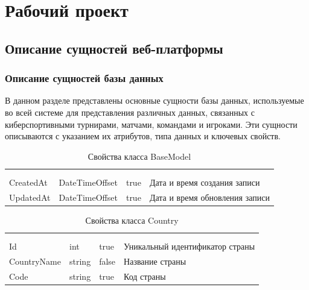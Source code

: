 \newsection
\section{Рабочий проект}
\subsection{Описание сущностей веб-платформы}
\subsubsection{Описание сущностей базы данных}

В данном разделе представлены основные сущности базы данных, используемые во всей системе для представления различных данных, связанных с киберспортивными турнирами, матчами, командами и игроками. Эти сущности описываются с указанием их атрибутов, типа данных и ключевых свойств.

\begin{xltabular}{\textwidth}{|X|X|X|X|}
	\caption{Свойства класса BaseModel}\label{table:BaseModel}\\ \hline
	 &  &  &  \\ \hline
	 &  &  &  \\ \hline
	\endfirsthead
	 \hline
	 &  &  &  \\ \hline
	\endhead
	CreatedAt & DateTimeOffset & true & Дата и время создания записи \\ \hline
	UpdatedAt & DateTimeOffset & true & Дата и время обновления записи \\ \hline
\end{xltabular}

\begin{xltabular}{\textwidth}{|X|X|X|X|}
	\caption{Свойства класса Country}\label{table:Country}\\ \hline
	 &  &  &  \\ \hline
	 &  &  &  \\ \hline
	\endfirsthead
	 \hline
	 &  &  &  \\ \hline
	\endhead
	Id & int & true & Уникальный идентификатор страны \\ \hline
	CountryName & string & false & Название страны \\ \hline
	Code & string & true & Код страны \\ \hline
\end{xltabular}

